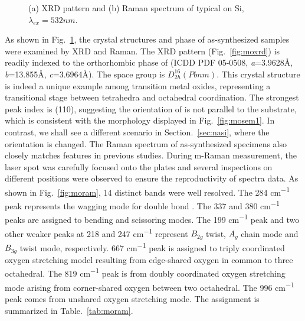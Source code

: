 \begin{figure}[htb]
\centering
{}\hspace{0.04\textwidth}
\caption[Crystalline phase characterization of  on Si]{(a) XRD pattern and (b) Raman spectrum of typical  on Si, $\lambda_{ex} = 532nm$.}
\label{fig:mooxch}
\end{figure}

As shown in Fig.~\ref{fig:mooxch}, the crystal structures and phase of as-synthesized samples were examined by XRD and Raman. The XRD pattern (Fig.~\ref{fig:moxrd}) is readily indexed to the orthorhombic phase of  (ICDD PDF 05-0508, \emph{a}=3.9628\AA, \emph{b}=13.855\AA, \emph{c}=3.6964\AA). The space group is $D_{2h}^{16}(Pbnm)$. This crystal structure is indeed a unique example among transition metal oxides, representing a transitional stage between tetrahedra and octahedral coordination.\cite{Itoh2001a} The strongest peak index is (110), suggesting the orientation of  is not parallel to the substrate, which is consistent with the morphology displayed in Fig.~\ref{fig:mosem1}. In contrast, we shall see a different scenario in Section.~\ref{sec:nasi}, where the orientation is changed. The Raman spectrum of as-synthesized specimens also closely matches  features in previous studies.\cite{Dixit1986,Silveira2012} During m-Raman measurement, the laser spot was carefully focused onto the plates and several inspections on different positions were observed to ensure the reproductivity of spectra data. As shown in Fig.~\ref{fig:moram}, 14 distinct bands were well resolved. The 284 \si{cm^{-1}} peak represents the wagging mode for double bond . The 337 and 380  \si{cm^{-1}} peaks are assigned to  bending and scissoring modes. The 199 \si{cm^{-1}} peak and two other weaker peaks at 218 and 247 \si{cm^{-1}} represent  $B_{2g}$ twist, $A_g$ chain mode and  $B_{3g}$ twist mode, respectively.    667 \si{cm^{-1}} peak is assigned to triply coordinated oxygen stretching model resulting from edge-shared oxygen in common to three octahedral. The 819 \si{cm^{-1}} peak is from doubly coordinated oxygen stretching mode arising from corner-shared oxygen between two octahedral. The 996 \si{cm^{-1}} peak comes from unshared oxygen stretching mode.\cite{Siciliano2009} The assignment is summarized in Table.~\ref{tab:moram}.

